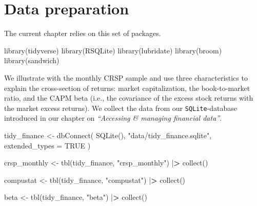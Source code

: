 \documentclass[
]{book}
\newenvironment{Shaded}{\begin{snugshade}}{\end{snugshade}}
\newcommand{\AttributeTok}[1]{\textcolor[rgb]{0.61,0.61,0.61}{#1}}
\newcommand{\ConstantTok}[1]{\textcolor[rgb]{0,0,0}{#1}}
\newcommand{\ErrorTok}[1]{\textcolor[rgb]{0.14,0.14,0.14}{\textbf{#1}}}
\newcommand{\FunctionTok}[1]{\textcolor[rgb]{0,0,0}{#1}}
\newcommand{\NormalTok}[1]{#1}
\newcommand{\OtherTok}[1]{\textcolor[rgb]{0.37,0.37,0.37}{#1}}
\newcommand{\SpecialCharTok}[1]{\textcolor[rgb]{0,0,0}{#1}}
\newcommand{\StringTok}[1]{\textcolor[rgb]{0.5,0.5,0.5}{#1}}
\begin{document}
\hypertarget{data-preparation-4}{%
\section{Data preparation}\label{data-preparation-4}}

The current chapter relies on this set of packages.

\begin{Shaded}
\begin{Highlighting}[]
\FunctionTok{library}\NormalTok{(tidyverse)}
\FunctionTok{library}\NormalTok{(RSQLite)}
\FunctionTok{library}\NormalTok{(lubridate)}
\FunctionTok{library}\NormalTok{(broom)}
\FunctionTok{library}\NormalTok{(sandwich)}
\end{Highlighting}
\end{Shaded}

We illustrate \citet{Fama1973} with the monthly CRSP sample and use three characteristics to explain the cross-section of returns: market capitalization, the book-to-market ratio, and the CAPM beta (i.e., the covariance of the excess stock returns with the market excess returns). We collect the data from our \texttt{SQLite}-database introduced in our chapter on \emph{``Accessing \& managing financial data''}.

\begin{Shaded}
\begin{Highlighting}[]
\NormalTok{tidy\_finance }\OtherTok{\textless{}{-}} \FunctionTok{dbConnect}\NormalTok{(}
  \FunctionTok{SQLite}\NormalTok{(), }\StringTok{"data/tidy\_finance.sqlite"}\NormalTok{, }\AttributeTok{extended\_types =} \ConstantTok{TRUE}
\NormalTok{)}

\NormalTok{crsp\_monthly }\OtherTok{\textless{}{-}} \FunctionTok{tbl}\NormalTok{(tidy\_finance, }\StringTok{"crsp\_monthly"}\NormalTok{) }\SpecialCharTok{|}\ErrorTok{\textgreater{}}
  \FunctionTok{collect}\NormalTok{()}

\NormalTok{compustat }\OtherTok{\textless{}{-}} \FunctionTok{tbl}\NormalTok{(tidy\_finance, }\StringTok{"compustat"}\NormalTok{) }\SpecialCharTok{|}\ErrorTok{\textgreater{}}
  \FunctionTok{collect}\NormalTok{()}

\NormalTok{beta }\OtherTok{\textless{}{-}} \FunctionTok{tbl}\NormalTok{(tidy\_finance, }\StringTok{"beta"}\NormalTok{) }\SpecialCharTok{|}\ErrorTok{\textgreater{}}
  \FunctionTok{collect}\NormalTok{()}
\end{Highlighting}
\end{Shaded}
\end{document}
